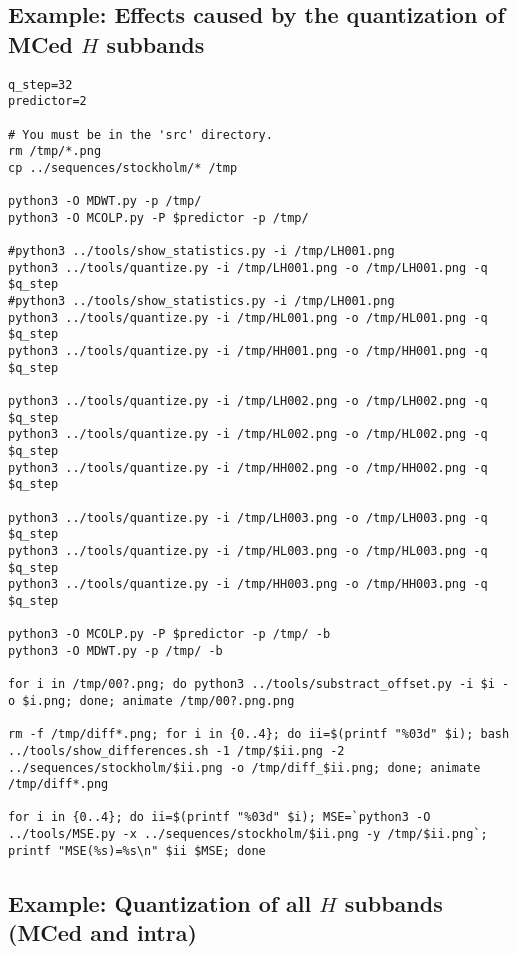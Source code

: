 
\subsection*{Example: Effects caused by the quantization of MCed $H$ subbands}

\begin{verbatim}
q_step=32
predictor=2

# You must be in the 'src' directory.
rm /tmp/*.png
cp ../sequences/stockholm/* /tmp

python3 -O MDWT.py -p /tmp/
python3 -O MCOLP.py -P $predictor -p /tmp/

#python3 ../tools/show_statistics.py -i /tmp/LH001.png
python3 ../tools/quantize.py -i /tmp/LH001.png -o /tmp/LH001.png -q $q_step
#python3 ../tools/show_statistics.py -i /tmp/LH001.png
python3 ../tools/quantize.py -i /tmp/HL001.png -o /tmp/HL001.png -q $q_step
python3 ../tools/quantize.py -i /tmp/HH001.png -o /tmp/HH001.png -q $q_step

python3 ../tools/quantize.py -i /tmp/LH002.png -o /tmp/LH002.png -q $q_step
python3 ../tools/quantize.py -i /tmp/HL002.png -o /tmp/HL002.png -q $q_step
python3 ../tools/quantize.py -i /tmp/HH002.png -o /tmp/HH002.png -q $q_step

python3 ../tools/quantize.py -i /tmp/LH003.png -o /tmp/LH003.png -q $q_step
python3 ../tools/quantize.py -i /tmp/HL003.png -o /tmp/HL003.png -q $q_step
python3 ../tools/quantize.py -i /tmp/HH003.png -o /tmp/HH003.png -q $q_step

python3 -O MCOLP.py -P $predictor -p /tmp/ -b
python3 -O MDWT.py -p /tmp/ -b

for i in /tmp/00?.png; do python3 ../tools/substract_offset.py -i $i -o $i.png; done; animate /tmp/00?.png.png

rm -f /tmp/diff*.png; for i in {0..4}; do ii=$(printf "%03d" $i); bash ../tools/show_differences.sh -1 /tmp/$ii.png -2 ../sequences/stockholm/$ii.png -o /tmp/diff_$ii.png; done; animate /tmp/diff*.png

for i in {0..4}; do ii=$(printf "%03d" $i); MSE=`python3 -O ../tools/MSE.py -x ../sequences/stockholm/$ii.png -y /tmp/$ii.png`; printf "MSE(%s)=%s\n" $ii $MSE; done
\end{verbatim}


\subsection*{Example: Quantization of all $H$ subbands (MCed and intra)}

